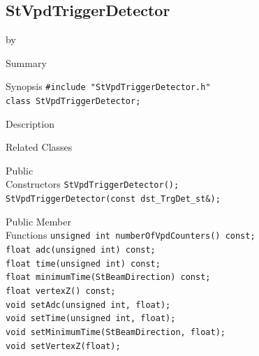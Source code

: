 \documentclass[twoside]{article}
\newcommand{\entrylabel}[1]{\mbox{\textbf{{#1}}}\hfil}%
\newenvironment{entry}
{\begin{list}{}%
    {\renewcommand{\makelabel}{\entrylabel}%
     \setlength{\labelwidth}{90pt}%
     \setlength{\leftmargin}{\labelwidth}
     \advance\leftmargin by \labelsep%
      }%
    }%
  {\end{list}}
\newcommand{\Entrylabel}[1]%
{\raisebox{0pt}[1ex][0pt]{\makebox[\labelwidth][l]%
    {\parbox[t]{\labelwidth}{\hspace{0pt}\textbf{{#1}}}}}}
\newenvironment{Entry}%
{\renewcommand{\entrylabel}{\Entrylabel}\begin{entry}}%
  {\end{entry}}
\begin{document}
\subsection{StVpdTriggerDetector}
\label{sec:StVpdTriggerDetector}
\begin{Entry}
\item[Summary]
\item[Synopsis]
    \verb+#include "StVpdTriggerDetector.h"+\\
    \verb+class StVpdTriggerDetector;+\\
\item[Description]
\item[Related Classes]
\item[Public\\ Constructors]
    \verb+StVpdTriggerDetector();+\\
    \verb+StVpdTriggerDetector(const dst_TrgDet_st&);+\\
\item[Public Member\\ Functions]
    \verb+unsigned int numberOfVpdCounters() const;+\\
    \verb+float adc(unsigned int) const;+\\
    \verb+float time(unsigned int) const;+\\
    \verb+float minimumTime(StBeamDirection) const;+\\
    \verb+float vertexZ() const;+\\
    \verb+void setAdc(unsigned int, float);+\\
    \verb+void setTime(unsigned int, float);+\\
    \verb+void setMinimumTime(StBeamDirection, float);+\\
    \verb+void setVertexZ(float);+\\
\end{Entry}
\clearpage
\end{document}
